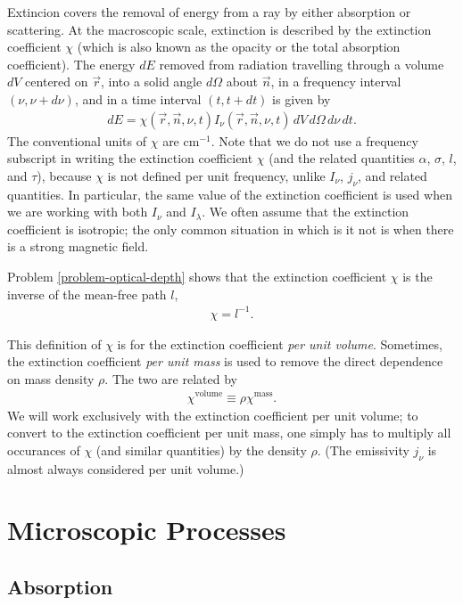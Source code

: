 Extincion covers the removal of energy from a ray by either
absorption or scattering. At the macroscopic scale,
extinction is described by the extinction coefficient
$\chi$ (which is also known as the opacity or the total
absorption coefficient). The energy $dE$ removed from
radiation travelling through a volume $dV$ centered on $\vec
r$, into a solid angle $d\Omega$ about $\vec n$, in a
frequency interval $(\nu,\nu+d\nu)$, and in a time interval
$(t,t+dt)$ is given by
\begin{align}
dE = \chi(\vec r, \vec n, \nu, t) I_\nu(\vec r, \vec n,
\nu, t)\,dV\,d\Omega\,d\nu\,dt.
\end{align}
The conventional units of $\chi$ are $\mathrm{cm}^{-1}$. Note that we do not use a frequency subscript in writing the
extinction coefficient $\chi$ (and the related quantities
$\alpha$, $\sigma$, $l$, and $\tau$), because $\chi$ is not
defined per unit frequency, unlike $I_\nu$, $j_\nu$, and related
quantities. In particular, the same value of the extinction
coefficient is used when we are working with both $I_\nu$ and
$I_\lambda$. We
often assume that the extinction coefficient is isotropic; the only common situation in which is it
not is when there is a strong magnetic field. 

Problem \ref{problem-optical-depth} shows that the extinction coefficient
$\chi$ is the inverse of the mean-free path
$l$,
\begin{align}
\chi = l^{-1}.
\end{align}

This definition of $\chi$ is for the extinction
coefficient \emph{per unit volume}. Sometimes, the extinction
coefficient \emph{per unit mass} is used to remove the direct
dependence on mass density $\rho$. The two are related by
\begin{align}
\chi^\mathrm{volume} \equiv \rho \chi^\mathrm{mass}.
\end{align}
We will work exclusively with the extinction coefficient per
unit volume; to convert to the extinction coefficient per
unit mass, one simply has to multiply all occurances of
$\chi$ (and similar quantities) by the density $\rho$.
(The emissivity $j_\nu$ is almost always considered per unit
volume.)

\newslide

\section{Microscopic Processes}

\subsection{Absorption}

